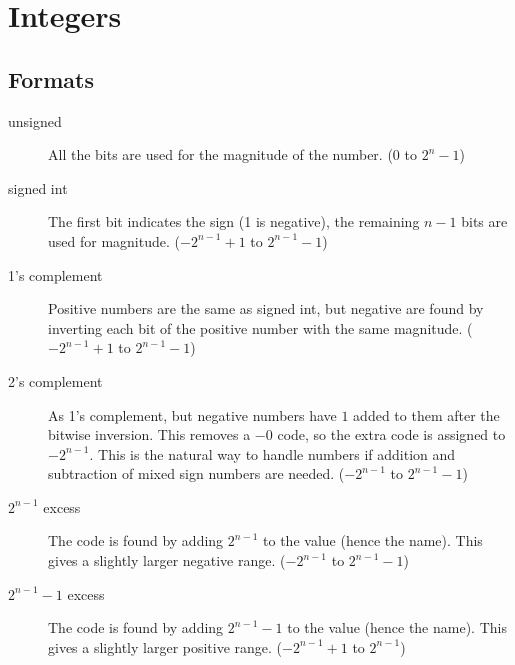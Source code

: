 \chapter{Integers}
\label{c-int}

\section{Formats}

\begin{description}
    \item [unsigned] All the bits are used for the magnitude of the number. ($0$ to $2^n-1$)
    \item [signed int] The first bit indicates the sign (1 is negative), the remaining $n-1$ bits are used for magnitude. ($-2^{n-1}+1$ to $2^{n-1}-1$)
    \item [1's complement] Positive numbers are the same as signed int, but negative are found by inverting each bit of the positive number with the same magnitude. ($-2^{n-1}+1$ to $2^{n-1}-1$)
    \item [2's complement] As 1's complement, but negative numbers have $1$ added to them after the bitwise inversion.  This removes a $-0$ code, so the extra code is assigned to $-2^{n-1}$.  This is the natural way to handle numbers if addition and subtraction of mixed sign numbers are needed.  ($-2^{n-1}$ to $2^{n-1}-1$)
    \item [$2^{n-1}$ excess] The code is found by adding $2^{n-1}$ to the value (hence the name).  This gives a slightly larger negative range. ($-2^{n-1}$ to $2^{n-1}-1$)
    \item [$2^{n-1}-1$ excess] The code is found by adding $2^{n-1}-1$ to the value (hence the name).  This gives a slightly larger positive range. ($-2^{n-1}+1$ to $2^{n-1}$)
\end{description}

